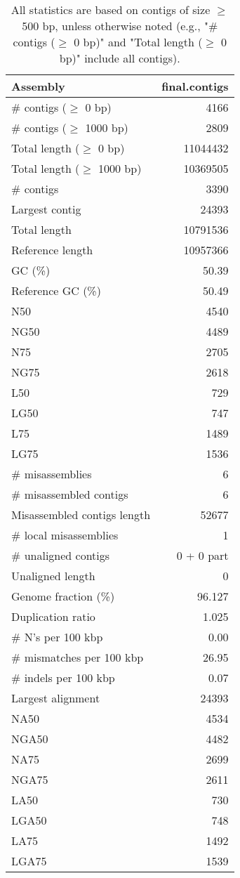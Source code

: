 \documentclass[12pt,a4paper]{article}
\begin{document}
\begin{table}[ht]
\begin{center}
\caption{All statistics are based on contigs of size $\geq$ 500 bp, unless otherwise noted (e.g., "\# contigs ($\geq$ 0 bp)" and "Total length ($\geq$ 0 bp)" include all contigs).}
\begin{tabular}{|l*{1}{|r}|}
\hline
Assembly & final.contigs \\ \hline
\# contigs ($\geq$ 0 bp) & 4166 \\ \hline
\# contigs ($\geq$ 1000 bp) & 2809 \\ \hline
Total length ($\geq$ 0 bp) & 11044432 \\ \hline
Total length ($\geq$ 1000 bp) & 10369505 \\ \hline
\# contigs & 3390 \\ \hline
Largest contig & 24393 \\ \hline
Total length & 10791536 \\ \hline
Reference length & 10957366 \\ \hline
GC (\%) & 50.39 \\ \hline
Reference GC (\%) & 50.49 \\ \hline
N50 & 4540 \\ \hline
NG50 & 4489 \\ \hline
N75 & 2705 \\ \hline
NG75 & 2618 \\ \hline
L50 & 729 \\ \hline
LG50 & 747 \\ \hline
L75 & 1489 \\ \hline
LG75 & 1536 \\ \hline
\# misassemblies & 6 \\ \hline
\# misassembled contigs & 6 \\ \hline
Misassembled contigs length & 52677 \\ \hline
\# local misassemblies & 1 \\ \hline
\# unaligned contigs & 0 + 0 part \\ \hline
Unaligned length & 0 \\ \hline
Genome fraction (\%) & 96.127 \\ \hline
Duplication ratio & 1.025 \\ \hline
\# N's per 100 kbp & 0.00 \\ \hline
\# mismatches per 100 kbp & 26.95 \\ \hline
\# indels per 100 kbp & 0.07 \\ \hline
Largest alignment & 24393 \\ \hline
NA50 & 4534 \\ \hline
NGA50 & 4482 \\ \hline
NA75 & 2699 \\ \hline
NGA75 & 2611 \\ \hline
LA50 & 730 \\ \hline
LGA50 & 748 \\ \hline
LA75 & 1492 \\ \hline
LGA75 & 1539 \\ \hline
\end{tabular}
\end{center}
\end{table}
\end{document}
